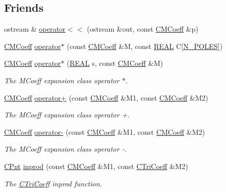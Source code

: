 \subsection*{Friends}
\begin{DoxyCompactItemize}
\item 
ostream \& \hyperlink{classCMCoeff_af219e14c617a293aad17ddf8f055db85}{operator$<$$<$} (ostream \&out, const \hyperlink{classCMCoeff}{C\-M\-Coeff} \&p)
\item 
\hyperlink{classCMCoeff}{C\-M\-Coeff} \hyperlink{classCMCoeff_a794db3eaa0d9cf84e4c8ca1023e4f54a}{operator$\ast$} (const \hyperlink{classCMCoeff}{C\-M\-Coeff} \&M, const \hyperlink{util_8h_a5821460e95a0800cf9f24c38915cbbde}{R\-E\-A\-L} C\mbox{[}\hyperlink{mcoeff_8h_ac23f9c13c5d07d9ce386f7a830c35e5a}{N\-\_\-\-P\-O\-L\-E\-S}\mbox{]})
\item 
\hyperlink{classCMCoeff}{C\-M\-Coeff} \hyperlink{classCMCoeff_a4bebac156440468c712dfce37bc9fc7c}{operator$\ast$} (\hyperlink{util_8h_a5821460e95a0800cf9f24c38915cbbde}{R\-E\-A\-L} s, const \hyperlink{classCMCoeff}{C\-M\-Coeff} \&M)
\begin{DoxyCompactList}\small\item\em The M\-Coeff expansion class operator $\ast$. \end{DoxyCompactList}\item 
\hyperlink{classCMCoeff}{C\-M\-Coeff} \hyperlink{classCMCoeff_ab6e8a538afe3d4f8de9c1fa4904479ec}{operator+} (const \hyperlink{classCMCoeff}{C\-M\-Coeff} \&M1, const \hyperlink{classCMCoeff}{C\-M\-Coeff} \&M2)
\begin{DoxyCompactList}\small\item\em The M\-Coeff expansion class operator +. \end{DoxyCompactList}\item 
\hyperlink{classCMCoeff}{C\-M\-Coeff} \hyperlink{classCMCoeff_a2f5f513c1e1864710b85443edbbc311a}{operator-\/} (const \hyperlink{classCMCoeff}{C\-M\-Coeff} \&M1, const \hyperlink{classCMCoeff}{C\-M\-Coeff} \&M2)
\begin{DoxyCompactList}\small\item\em The M\-Coeff expansion class operator -\/. \end{DoxyCompactList}\item 
\hyperlink{classCPnt}{C\-Pnt} \hyperlink{classCMCoeff_a095588ecdb857546a57e3f8f33ec983d}{inprod} (const \hyperlink{classCMCoeff}{C\-M\-Coeff} \&M1, const \hyperlink{classCTriCoeff}{C\-Tri\-Coeff} \&M2)
\begin{DoxyCompactList}\small\item\em The \hyperlink{classCTriCoeff}{C\-Tri\-Coeff} inprod function. \end{DoxyCompactList}\item 

\end{DoxyCompactItemize}
